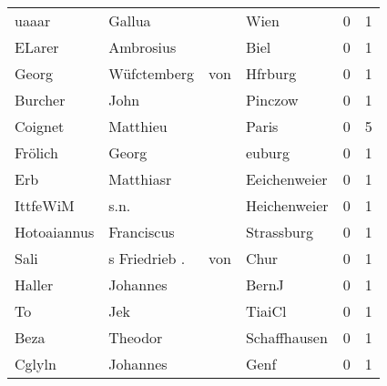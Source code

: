 \begin{tabular}{llllrr}
                    uaaar &                             Gallua &             &                                        Wien &          0 &         1 \\
                   ELarer &                          Ambrosius &             &                                        Biel &          0 &         1 \\
                    Georg &                        Wüfctemberg &         von &                                     Hfrburg &          0 &         1 \\
                  Burcher &                               John &             &                                     Pinczow &          0 &         1 \\
                  Coignet &                           Matthieu &             &                                       Paris &          0 &         5 \\
                  Frölich &                              Georg &             &                                      euburg &          0 &         1 \\
                      Erb &                          Matthiasr &             &                                Eeichenweier &          0 &         1 \\
                 IttfeWiM &                               s.n. &             &                                Heichenweier &          0 &         1 \\
              Hotoaiannus &                         Franciscus &             &                                  Strassburg &          0 &         1 \\
                     Sali &                      s Friedrieb . &         von &                                        Chur &          0 &         1 \\
                   Haller &                           Johannes &             &                                       BernJ &          0 &         1 \\
                       To &                                Jek &             &                                      TiaiCl &          0 &         1 \\
                     Beza &                            Theodor &             &                                Schaffhausen &          0 &         1 \\
                   Cglyln &                           Johannes &             &                                        Genf &          0 &         1 \\

\end{tabular}
